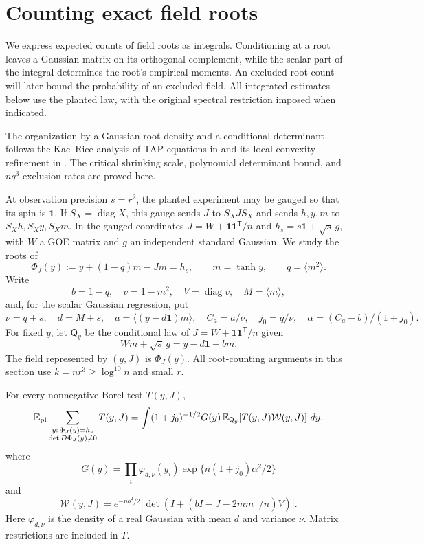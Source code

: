 \section{Counting exact field roots}\label{prof:roots}

We express expected counts of field roots as integrals. Conditioning at
a root leaves a Gaussian matrix on its orthogonal complement, while the
scalar part of the integral determines the root's empirical moments.
An excluded root count will later bound the probability of an excluded
field. All integrated estimates below use the planted law, with the
original spectral restriction imposed when indicated.

The organization by a Gaussian root density and a conditional determinant
follows the Kac--Rice analysis of TAP equations in
\citet[Sections~3--4]{FanMeiMontanari2021} and its local-convexity refinement
in \citet[Lemma~4.8 and Appendix~A.5]{CelentanoFanMei2023}.
The critical shrinking scale, polynomial determinant bound, and
$nq^3$ exclusion rates are proved here.

At observation precision $s=r^2$, the planted experiment may be
gauged so that its spin is $\mathbf1$. If $S_X=\operatorname{diag}X$,
this gauge sends $J$ to $S_XJS_X$ and sends $h,y,m$ to
$S_Xh,S_Xy,S_Xm$. In the gauged coordinates
$J=W+\mathbf1\mathbf1^{\mathsf T}/n$ and
$h_s=s\mathbf1+\sqrt s\,g$, with $W$ a GOE matrix and $g$ an
independent standard Gaussian. We study the roots of
\[
 \Phi_J(y):=y+(1-q)m-Jm=h_s,\qquad
 m=\tanh y,\qquad q=\langle m^2\rangle.
\]
Write
\[
 b=1-q,\quad v=1-m^2,\quad V=\operatorname{diag}v,\quad
 M=\langle m\rangle,
\]
and, for the scalar Gaussian regression, put
\[
 \nu=q+s,\quad d=M+s,\quad a=\langle(y-d\mathbf1)m\rangle,\quad
 C_a=a/\nu,\quad j_0=q/\nu,\quad
 \alpha=(C_a-b)/(1+j_0).
\]
For fixed $y$, let $\mathsf Q_y$ be the conditional law
of $J=W+\mathbf1\mathbf1^{\mathsf T}/n$ given
\[
 Wm+\sqrt s\,g=y-d\mathbf1+bm.
\]
The field represented by $(y,J)$ is $\Phi_J(y)$. All root-counting
arguments in this section use $k=nr^3\ge\log^{10}n$ and small $r$.
\begin{lemma}\label{prof:root-count}
For every nonnegative Borel test $T(y,J)$,
\[
 \mathbb E_{\rm pl}\sum_{\substack{y:\,\Phi_J(y)=h_s\\
                         \det D\Phi_J(y)\ne0}}T(y,J)
 =\int (1+j_0)^{-1/2}G(y)\,
       \mathbb E_{\mathsf Q_y}\!\left[T(y,J)\mathcal W(y,J)\right]\,dy,
\]
where
\[
 G(y)=\prod_i \varphi_{d,\nu}(y_i)\exp\{n(1+j_0)\alpha^2/2\}
\]
and
\begin{equation}\label{prof:eq8}
\mathcal W(y,J)
=e^{-nb^2/2}|\det(I+(bI-J-2mm^{\mathsf T}/n)V)|.
\end{equation}
Here $\varphi_{d,\nu}$ is the density of a real Gaussian with mean
$d$ and variance $\nu$. Matrix restrictions are included in $T$.
\end{lemma}


